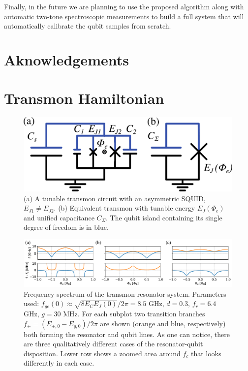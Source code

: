 \documentclass[%
 aip,
 draft,
 amsmath,amssymb,
 reprint,%
]{revtex4-1}
\begin{document}
Finally, in the future we are planning to use the proposed algorithm along with automatic two-tone spectroscopic measurements to build a full system that will automatically calibrate the qubit samples from scratch.


\section{Aknowledgements}


\appendix



\section{Transmon Hamiltonian}\label{sec:transmon}

\begin{figure}[b]
	\centering
	\includegraphics[width=\linewidth]{transmon}
	\caption{(a) A tunable transmon circuit with an asymmetric SQUID, $E_{J1} \neq E_{J2}$. (b) Equivalent transmon with tunable energy $E_{J}(\Phi_e)$ and unified capacitance $C_{\Sigma}$. The qubit island containing its single degree of freedom is in blue.}
	\label{fig:trans}
\end{figure}

\begin{figure}
	\centering
	\includegraphics[width=\textwidth]{anti_theor}
	\caption{Frequency spectrum of the transmon-resonator system. Parameters used: $f_{ge}(0) \approx \sqrt{8E_C E_J(0)}/2\pi = 8.5$ GHz, $d=0.3$, $f_r=6.4$ GHz, $g = 30$ MHz. For each subplot two transition branches  $f_{\pm} = (E_{\pm,0} - E_{g,0})/2\pi$ are shown (orange and blue, respectively) both forming the resonator and qubit lines. As one can notice, there are three qualitatively different cases of the resonator-qubit disposition. Lower row shows a zoomed area around $f_c$ that looks differently in each case.}
	\label{fig:anti_theor}
\end{figure}
\end{document}
